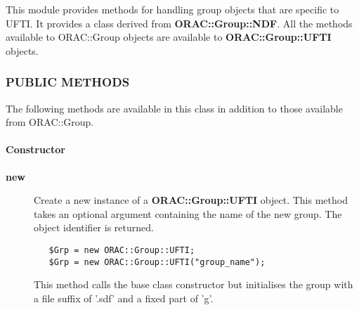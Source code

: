This module provides methods for handling group objects that
are specific to UFTI. It provides a class derived from \textbf{ORAC::Group::NDF}.
All the methods available to ORAC::Group objects are available
to \textbf{ORAC::Group::UFTI} objects.

\subsubsection*{PUBLIC METHODS\label{ORAC::Group::UFTI_PUBLIC_METHODS}}


The following methods are available in this class in addition to
those available from ORAC::Group.

\paragraph*{Constructor\label{ORAC::Group::UFTI_Constructor}}
\begin{description}

\item[\textbf{new}] \mbox{}

Create a new instance of a \textbf{ORAC::Group::UFTI} object.
This method takes an optional argument containing the
name of the new group. The object identifier is returned.

\begin{verbatim}
   $Grp = new ORAC::Group::UFTI;
   $Grp = new ORAC::Group::UFTI("group_name");
\end{verbatim}


This method calls the base class constructor but initialises
the group with a file suffix of '.sdf' and a fixed part
of 'g'.

\end{description}

